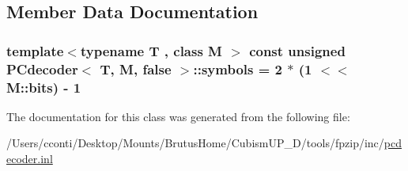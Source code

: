 \subsection{Member Data Documentation}
\hypertarget{class_p_cdecoder_3_01_t_00_01_m_00_01false_01_4_a95d1ba8f67b524c03121f097dcc03860}{}
\subsubsection[{symbols}]{\setlength{\rightskip}{0pt plus 5cm}template$<$typename T , class M $>$ const unsigned {\bf P\+Cdecoder}$<$ T, M, false $>$\+::symbols = 2 $\ast$ (1 $<$$<$ M\+::bits) -\/ 1\hspace{0.3cm}{\ttfamily [static]}}\label{class_p_cdecoder_3_01_t_00_01_m_00_01false_01_4_a95d1ba8f67b524c03121f097dcc03860}


The documentation for this class was generated from the following file\+:\begin{DoxyCompactItemize}
\item 
/\+Users/cconti/\+Desktop/\+Mounts/\+Brutus\+Home/\+Cubism\+U\+P\+\_\+D/tools/fpzip/inc/\hyperlink{pcdecoder_8inl}{pcdecoder.\+inl}\end{DoxyCompactItemize}
